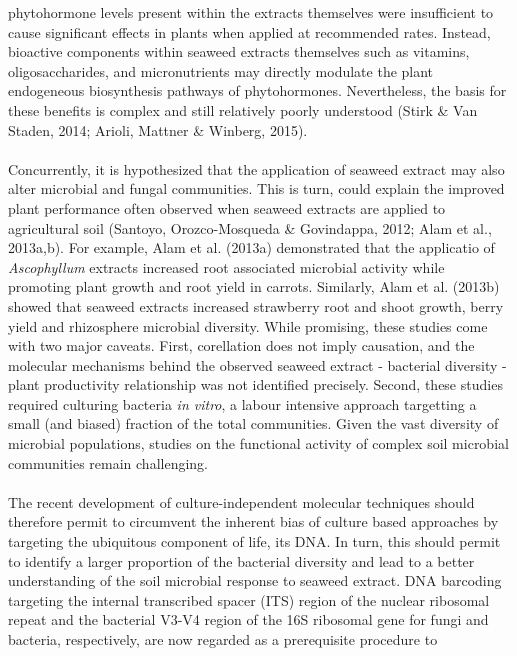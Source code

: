 \documentclass[11pt,]{article}
\begin{document}
phytohormone levels present within the extracts themselves were
insufficient to cause significant effects in plants when applied at
recommended rates. Instead, bioactive components within seaweed extracts
themselves such as vitamins, oligosaccharides, and micronutrients may
directly modulate the plant endogeneous biosynthesis pathways of
phytohormones. Nevertheless, the basis for these benefits is complex and
still relatively poorly understood (Stirk \& Van Staden, 2014; Arioli,
Mattner \& Winberg, 2015).\\
\hspace*{0.333em}\\
Concurrently, it is hypothesized that the application of seaweed extract
may also alter microbial and fungal communities. This is turn, could
explain the improved plant performance often observed when seaweed
extracts are applied to agricultural soil (Santoyo, Orozco-Mosqueda \&
Govindappa, 2012; Alam et al., 2013a,b). For example, Alam et al.
(2013a) demonstrated that the applicatio of \emph{Ascophyllum} extracts
increased root associated microbial activity while promoting plant
growth and root yield in carrots. Similarly, Alam et al. (2013b) showed
that seaweed extracts increased strawberry root and shoot growth, berry
yield and rhizosphere microbial diversity. While promising, these
studies come with two major caveats. First, corellation does not imply
causation, and the molecular mechanisms behind the observed seaweed
extract - bacterial diversity - plant productivity relationship was not
identified precisely. Second, these studies required culturing bacteria
\emph{in vitro}, a labour intensive approach targetting a small (and
biased) fraction of the total communities. Given the vast diversity of
microbial populations, studies on the functional activity of complex
soil microbial communities remain challenging.\\
\hspace*{0.333em}\\
The recent development of culture-independent molecular techniques
should therefore permit to circumvent the inherent bias of culture based
approaches by targeting the ubiquitous component of life, its DNA. In
turn, this should permit to identify a larger proportion of the
bacterial diversity and lead to a better understanding of the soil
microbial response to seaweed extract. DNA barcoding targeting the
internal transcribed spacer (ITS) region of the nuclear ribosomal repeat
and the bacterial V3-V4 region of the 16S ribosomal gene for fungi and
bacteria, respectively, are now regarded as a prerequisite procedure to
\end{document}
